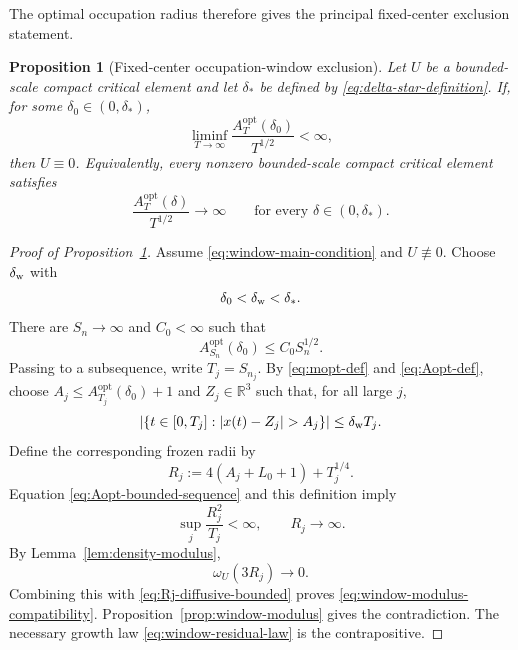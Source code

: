 \documentclass[preprint,12pt]{elsarticle}
\numberwithin{equation}{section}
\newtheorem{proposition}[theorem]{Proposition}
\theoremstyle{remark}
\newcommand{\R}{\mathbb R}
\newcommand{\Aopt}{A^{\mathrm{opt}}}
\begin{document}
The optimal occupation radius therefore gives the principal fixed-center exclusion statement.

\begin{proposition}[Fixed-center occupation-window exclusion]\label{prop:window-rigidity}
Let $U$ be a bounded-scale compact critical element and let $\delta_*$ be defined by \eqref{eq:delta-star-definition}. If, for some $\delta_0\in(0,\delta_*)$,
\begin{equation}\label{eq:window-main-condition}
  \liminf_{T\to\infty}
  \frac{\Aopt_T(\delta_0)}{T^{1/2}}<\infty,
\end{equation}
then $U\equiv0$. Equivalently, every nonzero bounded-scale compact critical element satisfies
\begin{equation}\label{eq:window-residual-law}
  \frac{\Aopt_T(\delta)}{T^{1/2}}\longrightarrow\infty
  \qquad\text{for every }\delta\in(0,\delta_*).
\end{equation}
\end{proposition}

\begin{proof}[Proof of Proposition~\ref{prop:window-rigidity}]
Assume \eqref{eq:window-main-condition} and $U\not\equiv0$. Choose $\delta_{\rm w}$ with
\[
  \delta_0<\delta_{\rm w}<\delta_*.
\]
There are $S_n\to\infty$ and $C_0<\infty$ such that
\begin{equation}\label{eq:Aopt-bounded-sequence}
  \Aopt_{S_n}(\delta_0)\le C_0S_n^{1/2}.
\end{equation}
Passing to a subsequence, write $T_j=S_{n_j}$. By \eqref{eq:mopt-def} and \eqref{eq:Aopt-def}, choose $A_j\le\Aopt_{T_j}(\delta_0)+1$ and $Z_j\in\R^3$ such that, for all large $j$,
\[
  \left|\{t\in[0,T_j]:|x(t)-Z_j|>A_j\}\right|
  \le\delta_{\rm w}T_j.
\]
Define the corresponding frozen radii by
\begin{equation*}
  R_j:=4(A_j+L_0+1)+T_j^{1/4}.
\end{equation*}
Equation \eqref{eq:Aopt-bounded-sequence} and this definition imply
\begin{equation}\label{eq:Rj-diffusive-bounded}
  \sup_j\frac{R_j^2}{T_j}<\infty,
  \qquad R_j\to\infty.
\end{equation}
By Lemma~\ref{lem:density-modulus},
\[
  \omega_U(3R_j)\to0.
\]
Combining this with \eqref{eq:Rj-diffusive-bounded} proves \eqref{eq:window-modulus-compatibility}. Proposition~\ref{prop:window-modulus} gives the contradiction. The necessary growth law \eqref{eq:window-residual-law} is the contrapositive.
\end{proof}
\end{document}
